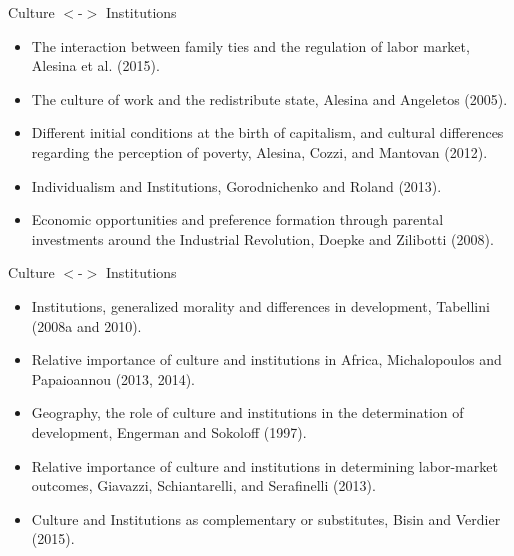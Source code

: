 \documentclass{beamer}
\begin{document}
\begin{frame}{Culture $<$-$>$ Institutions  }

\begin{itemize}
    \item  The interaction between family ties and the regulation of labor market, Alesina et al. (2015).
    \pause 
    \item  The culture of work and the redistribute state, Alesina and Angeletos (2005).
    \pause
    \item  Different initial conditions at the birth of capitalism, and  cultural differences regarding the perception  of poverty, Alesina, Cozzi, and Mantovan (2012).
    \pause
    \item  Individualism and Institutions, Gorodnichenko and Roland (2013).
    \pause
    \item  Economic opportunities and preference formation through parental investments around the Industrial Revolution, Doepke and Zilibotti (2008).
\end{itemize}
    
\end{frame}

\begin{frame}{Culture $<$-$>$ Institutions  }

\begin{itemize}
    \item  Institutions, generalized morality  and differences in development, Tabellini (2008a and 2010).
    \pause 
    \item  Relative importance of culture and institutions in Africa, Michalopoulos and Papaioannou (2013, 2014).
    \pause
    \item   Geography, the role of culture and institutions in the determination of development, Engerman and Sokoloff (1997).
    \pause
    \item   Relative importance of culture and institutions in determining labor-market outcomes, Giavazzi, Schiantarelli, and Serafinelli (2013).
    \pause
    \item Culture and Institutions as complementary or substitutes,  Bisin and Verdier (2015).
\end{itemize}
    
\end{frame}
\end{document}
